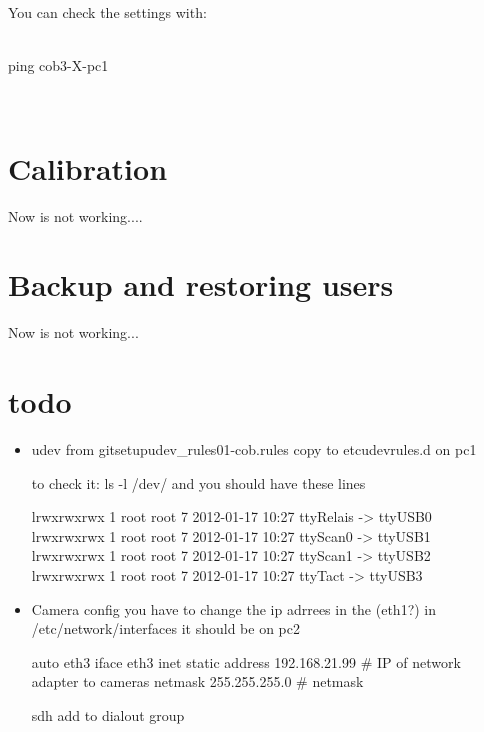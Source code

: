 You can check the settings with:
\\
\\   \colorbox{light-gray}{
         \begin{minipage}{1.0\textwidth} 
		ping cob3-X-pc1
         \end{minipage}  } \\



\section{Calibration}
Now is not working....
\section{Backup and restoring users}   
Now is not working...    

\section{todo}
\begin{itemize}
\item {udev from git\/setup\/udev\_rules\/01-cob.rules copy to \/etc\/udev\/rules.d on pc1}

to check it: ls -l /dev/ and you should have these lines

lrwxrwxrwx 1 root root           7 2012-01-17 10:27 ttyRelais -> ttyUSB0\\
lrwxrwxrwx 1 root root           7 2012-01-17 10:27 ttyScan0 -> ttyUSB1\\
lrwxrwxrwx 1 root root           7 2012-01-17 10:27 ttyScan1 -> ttyUSB2\\
lrwxrwxrwx 1 root root           7 2012-01-17 10:27 ttyTact -> ttyUSB3\\



\item {Camera config you have to change the ip adrrees in the (eth1?) in /etc/network/interfaces it should be on pc2}


auto eth3
iface eth3 inet static
address 192.168.21.99   \# IP of network adapter to cameras
netmask 255.255.255.0   \# netmask

sdh add to dialout group

\end{itemize}